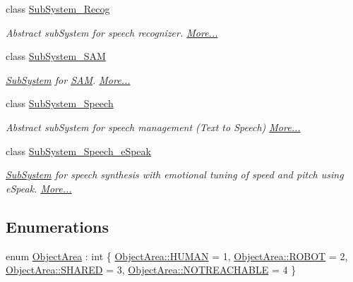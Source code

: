 \begin{DoxyCompactItemize}
class \hyperlink{group__icubclient__subsystems_classicubclient_1_1SubSystem__Recog}{Sub\+System\+\_\+\+Recog}
\begin{DoxyCompactList}\small\item\em Abstract sub\+System for speech recognizer.  \hyperlink{group__icubclient__subsystems_classicubclient_1_1SubSystem__Recog}{More...}\end{DoxyCompactList}\item 
class \hyperlink{group__icubclient__subsystems_classicubclient_1_1SubSystem__SAM}{Sub\+System\+\_\+\+S\+AM}
\begin{DoxyCompactList}\small\item\em \hyperlink{group__icubclient__subsystems_classicubclient_1_1SubSystem}{Sub\+System} for \hyperlink{namespaceSAM}{S\+AM}.  \hyperlink{group__icubclient__subsystems_classicubclient_1_1SubSystem__SAM}{More...}\end{DoxyCompactList}\item 
class \hyperlink{group__icubclient__subsystems_classicubclient_1_1SubSystem__Speech}{Sub\+System\+\_\+\+Speech}
\begin{DoxyCompactList}\small\item\em Abstract sub\+System for speech management (Text to Speech)  \hyperlink{group__icubclient__subsystems_classicubclient_1_1SubSystem__Speech}{More...}\end{DoxyCompactList}\item 
class \hyperlink{group__icubclient__subsystems_classicubclient_1_1SubSystem__Speech__eSpeak}{Sub\+System\+\_\+\+Speech\+\_\+e\+Speak}
\begin{DoxyCompactList}\small\item\em \hyperlink{group__icubclient__subsystems_classicubclient_1_1SubSystem}{Sub\+System} for speech synthesis with emotional tuning of speed and pitch using e\+Speak.  \hyperlink{group__icubclient__subsystems_classicubclient_1_1SubSystem__Speech__eSpeak}{More...}\end{DoxyCompactList}\end{DoxyCompactItemize}
\subsection*{Enumerations}
\begin{DoxyCompactItemize}
\item 
enum \hyperlink{namespaceicubclient_a582031d3e105cc59d614d15d30d22e65}{Object\+Area} \+: int \{ \newline
\hyperlink{namespaceicubclient_a582031d3e105cc59d614d15d30d22e65aa36c6719f4d3207d858cf956ef1e93b6}{Object\+Area\+::\+H\+U\+M\+AN} = 1, 
\newline
\hyperlink{namespaceicubclient_a582031d3e105cc59d614d15d30d22e65a9c3a09b4e8dfc7b3eaa6ae184f94b815}{Object\+Area\+::\+R\+O\+B\+OT} = 2, 
\newline
\hyperlink{namespaceicubclient_a582031d3e105cc59d614d15d30d22e65a049518eb4dc1859c7cebbe15876cfd63}{Object\+Area\+::\+S\+H\+A\+R\+ED} = 3, 
\newline
\hyperlink{namespaceicubclient_a582031d3e105cc59d614d15d30d22e65a6b5cdbf9097e427c941db5d62faed74e}{Object\+Area\+::\+N\+O\+T\+R\+E\+A\+C\+H\+A\+B\+LE} = 4
 \}
\end{DoxyCompactItemize}
